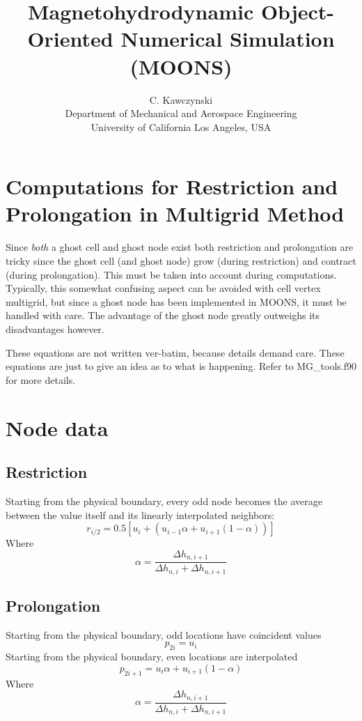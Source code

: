 \documentclass[11pt]{article}
\begin{document}
\doublespacing
\title{Magnetohydrodynamic Object-Oriented Numerical Simulation (MOONS)}
\author{C. Kawczynski \\
Department of Mechanical and Aerospace Engineering \\
University of California Los Angeles, USA\\
}
\maketitle

\section{Computations for Restriction and Prolongation in Multigrid Method}
Since \textit{both} a ghost cell and ghost node exist both restriction and prolongation are tricky since the ghost cell (and ghost node) grow (during restriction) and contract (during prolongation). This must be taken into account during computations. Typically, this somewhat confusing aspect can be avoided with cell vertex multigrid, but since a ghost node has been implemented in MOONS, it must be handled with care. The advantage of the ghost node greatly outweighs its disadvantages however.

These equations are not written ver-batim, because details demand care. These equations are just to give an idea as to what is happening. Refer to MG\_tools.f90 for more details.

\section{Node data}

\subsection{Restriction}
Starting from the physical boundary, every odd node becomes the average between the value itself and its linearly interpolated neighbors:
\begin{equation}
	r_{i/2} = 0.5 \left[ u_i + (u_{i-1}\alpha + u_{i+1}(1-\alpha)) \right]
\end{equation}
Where
\begin{equation}
	\alpha = \frac{\Delta h_{n,i+1}}{\Delta h_{n,i} + \Delta h_{n,i+1}}
\end{equation}

\subsection{Prolongation}
Starting from the physical boundary, odd locations have coincident values
\begin{equation}
	p_{2i} = u_{i}
\end{equation}
Starting from the physical boundary, even locations are interpolated
\begin{equation}
	p_{2i+1} = u_{i}\alpha + u_{i+1}(1 - \alpha)
\end{equation}
Where
\begin{equation}
	\alpha = \frac{\Delta h_{n,i+1}}{\Delta h_{n,i} + \Delta h_{n,i+1}}
\end{equation}
\end{document}
